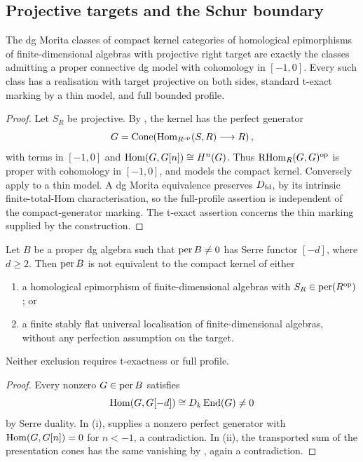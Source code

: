 \subsection{Projective targets and the Schur boundary}

\begin{corollary}\label{cor:projective-target-classes}
The dg Morita classes of compact kernel categories of homological epimorphisms of finite-dimensional algebras with projective right target are exactly the classes admitting a proper connective dg model with cohomology in \([-1,0]\).  Every such class has a realisation with target projective on both sides, standard t-exact marking by a thin model, and full bounded profile.
\end{corollary}

\begin{proof}
Let \(S_R\) be projective.  By , the kernel has the perfect generator
\[
 G=\operatorname{Cone}\!\left(\operatorname{Hom}_{R^{\mathrm{op}}}(S,R)\longrightarrow R\right),
\]
with terms in \([-1,0]\) and \(\operatorname{Hom}(G,G[n])\cong H^n(G)\).  Thus \(\operatorname{RHom}_R(G,G)^{\mathrm{op}}\) is proper with cohomology in \([-1,0]\), and models the compact kernel.  Conversely apply  to a thin model.  A dg Morita equivalence preserves \(D_{\mathrm{fd}}\), by its intrinsic finite-total-Hom characterisation, so the full-profile assertion is independent of the compact-generator marking.  The t-exact assertion concerns the thin marking supplied by the construction.
\end{proof}

\begin{proposition}\label{prop:negative-cy-obstruction}
Let \(B\) be a proper dg algebra such that \(\operatorname{per} B\ne0\) has Serre functor \([-d]\), where \(d\ge2\).  Then \(\operatorname{per} B\) is not equivalent to the compact kernel of either
\begin{enumerate}[label=\textup{(\roman*)}]
\item a homological epimorphism of finite-dimensional algebras with \(S_R\in\operatorname{per}(R^{\mathrm{op}})\); or
\item a finite stably flat universal localisation of finite-dimensional algebras, without any perfection assumption on the target.
\end{enumerate}
Neither exclusion requires t-exactness or full profile.
\end{proposition}

\begin{proof}
Every nonzero \(G\in\operatorname{per} B\) satisfies
\[
 \operatorname{Hom}(G,G[-d])\cong D_k\operatorname{End}(G)\ne0
\]
by Serre duality.  In (i),  supplies a nonzero perfect generator with \(\operatorname{Hom}(G,G[n])=0\) for \(n<-1\), a contradiction.  In (ii), the transported sum of the presentation cones has the same vanishing by , again a contradiction.
\end{proof}

